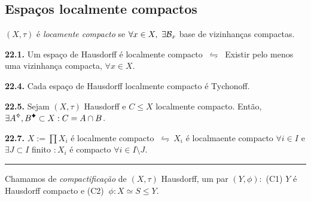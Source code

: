 \subsection*{Espaços localmente compactos}

\begin{definition}
    \((X,\tau)\) é \emph{locamente compacto} se \(\forall x \in X, \ \exists \mathcal{B}_x\) base de vizinhanças compactas.  
\end{definition}

\begin{proposition}
    \textbf{22.1.} Um espaço de Hausdorff  é localmente compacto \(\ \leftrightharpoons \ \) Existir pelo menos uma vizinhança compacta, \(\forall x \in X\).  
\end{proposition}


\begin{theorem}
    \textbf{22.4.} Cada espaço de Hausdorff localmente compacto é Tychonoff. 
\end{theorem}

\begin{proposition}
    \textbf{22.5.} Sejam \((X,\tau)\) Hausdorff e \(C\leq X\) localmente compacto. Então, \(\exists A\ab, B\ce \subset X : C  = A \cap B \). 
\end{proposition}

\begin{proposition}
    \textbf{22.7.} \(X:= \prod X_i\) é localmente compacto \(\ \leftrightharpoons \ X_i\) é localmaente compacto \(\forall i \in I\) e \(\exists J\subset I\) finito \(: X_i \) é compacto \(\forall i \in I \setminus J\).  
\end{proposition}

\vspace{0.5cm}
\hrule 

\begin{definition}
    Chamamos de \emph{compactificação} de \((X,\tau)\) Hausdorff, um par \((Y, \phi): \) (C1) \(Y\) é Hausdorff compacto e (C2) \(\ \phi: X \simeq S \leq Y\). 
\end{definition}

